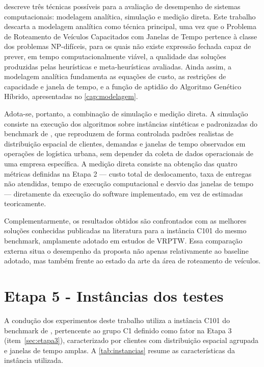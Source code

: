  descreve três técnicas possíveis para a avaliação de desempenho
de sistemas computacionais: modelagem analítica, simulação e medição direta. Este
trabalho descarta a modelagem analítica como técnica principal, uma vez que o Problema
de Roteamento de Veículos Capacitados com Janelas de Tempo pertence à classe dos
problemas NP-difíceis, para os quais não existe expressão fechada capaz de prever, em
tempo computacionalmente viável, a qualidade das soluções produzidas pelas heurísticas
e meta-heurísticas avaliadas. Ainda assim, a modelagem analítica fundamenta as
equações de custo, as restrições de capacidade e janela de tempo, e a função de aptidão
do Algoritmo Genético Híbrido, apresentadas no \autoref{cap:modelagem}.

Adota-se, portanto, a combinação de simulação e medição direta. A simulação consiste na
execução dos algoritmos sobre instâncias sintéticas e padronizadas do benchmark de
, que reproduzem de forma controlada padrões realistas de distribuição
espacial de clientes, demandas e janelas de tempo observados em operações de logística
urbana, sem depender da coleta de dados operacionais de uma empresa específica. A
medição direta consiste na obtenção das quatro métricas definidas na Etapa 2 --- custo
total de deslocamento, taxa de entregas não atendidas, tempo de execução computacional
e desvio das janelas de tempo --- diretamente da execução do software implementado, em
vez de estimadas teoricamente.

Complementarmente, os resultados obtidos são confrontados com as melhores soluções
conhecidas publicadas na literatura para a instância C101 do mesmo benchmark,
amplamente adotado em estudos de VRPTW. Essa comparação externa situa o desempenho da
proposta não apenas relativamente ao baseline adotado, mas também frente ao estado da
arte da área de roteamento de veículos.

\section{Etapa 5 - Instâncias dos testes}
\label{sec:etapa5}

A condução dos experimentos deste trabalho utiliza a instância C101 do benchmark de
, pertencente ao grupo C1 definido como fator na Etapa 3
(item~\ref{sec:etapa3}), caracterizado por clientes com distribuição espacial agrupada
e janelas de tempo amplas. A \autoref{tab:instancias} resume as características da
instância utilizada.

